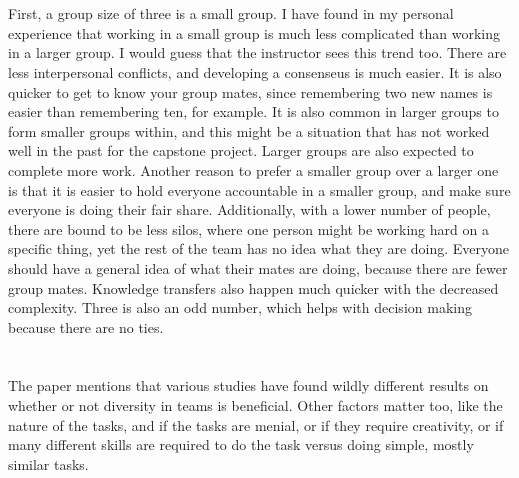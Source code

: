\documentclass[letterpaper,12pt]{article}
\begin{document}
  \section{}
  First, a group size of three is a small group. I have found in my personal
experience that working in a small group is much less complicated than working
in a larger group. I would guess that the instructor sees this trend too.  There
are less interpersonal conflicts, and developing a consenseus is much easier. It
is also quicker to get to know your group mates, since remembering two new names
is easier than remembering ten, for example. It is also common in larger groups
to form smaller groups within, and this might be a situation that has not worked
well in the past for the capstone project. Larger groups are also expected to
complete more work. Another reason to prefer a smaller group over a larger one
is that it is easier to hold everyone accountable in a smaller group, and make
sure everyone is doing their fair share.  Additionally, with a lower number of
people, there are bound to be less silos, where one person might be working hard
on a specific thing, yet the rest of the team has no idea what they are doing.
Everyone should have a general idea of what their mates are doing,  because
there are fewer group mates.  Knowledge transfers also happen much quicker with
the decreased complexity. Three is also an odd number, which helps with decision
making because there are no ties.

\section{}
The paper mentions that various studies have found wildly different results on
whether or not diversity in teams is beneficial. Other factors matter too, like
the nature of the tasks, and if the tasks are menial, or if they require
creativity, or if many different skills are required to do the task versus doing
simple, mostly similar tasks.
\end{document}
